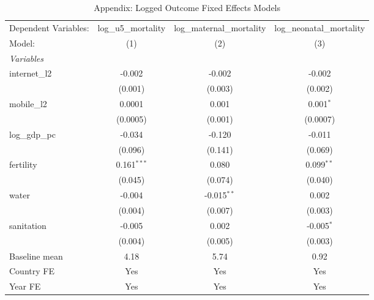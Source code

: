 \begin{table}[htbp]
   \caption{\label{tab:appendix_logged_outcomes} Appendix: Logged Outcome Fixed Effects Models}
   \centering
   \begin{tabular}{lccc}
      \tabularnewline \midrule \midrule
      Dependent Variables: & log\_u5\_mortality   & log\_maternal\_mortality   & log\_neonatal\_mortality\\    
      Model:               & (1)                  & (2)                        & (3)\\  
      \midrule
      \emph{Variables}\\
      internet\_l2         & -0.002               & -0.002                     & -0.002\\   
                           & (0.001)              & (0.003)                    & (0.002)\\   
      mobile\_l2           & 0.0001               & 0.001                      & 0.001$^{*}$\\   
                           & (0.0005)             & (0.001)                    & (0.0007)\\   
      log\_gdp\_pc         & -0.034               & -0.120                     & -0.011\\   
                           & (0.096)              & (0.141)                    & (0.069)\\   
      fertility            & 0.161$^{***}$        & 0.080                      & 0.099$^{**}$\\   
                           & (0.045)              & (0.074)                    & (0.040)\\   
      water                & -0.004               & -0.015$^{**}$              & 0.002\\   
                           & (0.004)              & (0.007)                    & (0.003)\\   
      sanitation           & -0.005               & 0.002                      & -0.005$^{*}$\\   
                           & (0.004)              & (0.005)                    & (0.003)\\   
      Baseline mean        & 4.18                 & 5.74                       & 0.92\\  
      Country FE           & Yes                  & Yes                        & Yes\\  
      Year FE              & Yes                  & Yes                        & Yes\\  

\end{tabular}
\end{table}
